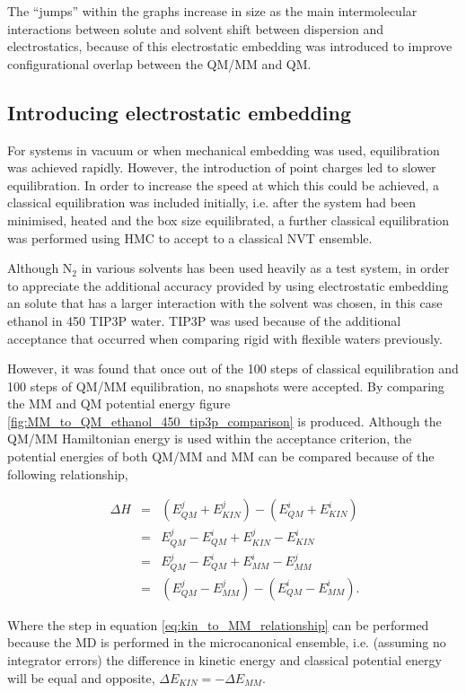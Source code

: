 The ``jumps'' within the graphs increase in size as the main intermolecular interactions between solute and solvent shift between dispersion and electrostatics, because of this electrostatic embedding was introduced to improve configurational overlap between the QM/MM and QM.

\subsection{Introducing electrostatic embedding}

For systems in vacuum or when mechanical embedding was used, equilibration was achieved rapidly.  However, the introduction of point charges led to slower equilibration.  In order to increase the speed at which this could be achieved, a classical equilibration was included initially, i.e. after the system had been minimised, heated and the box size equilibrated, a further classical equilibration was performed using HMC to accept to a classical NVT ensemble.

Although N$_2$ in various solvents has been used heavily as a test system, in order to appreciate the additional accuracy provided by using electrostatic embedding an solute that has a larger interaction with the solvent was chosen, in this case ethanol in 450 TIP3P water.  TIP3P was used because of the additional acceptance that occurred when comparing rigid with flexible waters previously.

However, it was found that once out of the 100 steps of classical equilibration and 100 steps of QM/MM equilibration, no snapshots were accepted.  By comparing the MM and QM potential energy figure \ref{fig:MM_to_QM_ethanol_450_tip3p_comparison} is produced.  Although the QM/MM Hamiltonian energy is used within the acceptance criterion, the potential energies of both QM/MM and MM can be compared because of the following relationship,

\begin{eqnarray}
\ \Delta H &=& (E_{QM}^j+E_{KIN}^j)-(E_{QM}^i+E_{KIN}^i) \\
\ &=& E_{QM}^j-E_{QM}^i + E_{KIN}^j - E_{KIN}^i \\
\ &=& E_{QM}^j-E_{QM}^i + E_{MM}^i - E_{MM}^j   \label{eq:kin_to_MM_relationship} \\
\ &=& (E_{QM}^j-E_{MM}^j) - (E_{QM}^i - E_{MM}^i) .
\end{eqnarray}

Where the step in equation \ref{eq:kin_to_MM_relationship} can be performed because the MD is performed in the microcanonical ensemble, i.e. (assuming no integrator errors) the difference in kinetic energy and classical potential energy will be equal and opposite, $\Delta E_{KIN}=-\Delta E_{MM}$.


